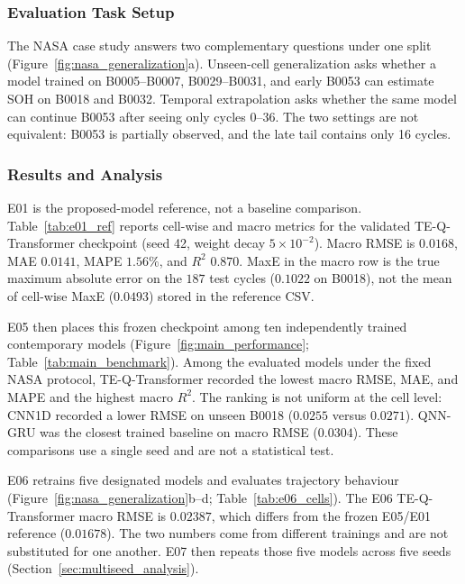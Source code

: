 \subsubsection{Evaluation Task Setup}
\label{sec:nasa_task_setup}

The NASA case study answers two complementary questions under one split (Figure~\ref{fig:nasa_generalization}a). Unseen-cell generalization asks whether a model trained on B0005--B0007, B0029--B0031, and early B0053 can estimate SOH on B0018 and B0032. Temporal extrapolation asks whether the same model can continue B0053 after seeing only cycles 0--36. The two settings are not equivalent: B0053 is partially observed, and the late tail contains only 16 cycles.

\subsubsection{Results and Analysis}
\label{sec:nasa_results}

E01 is the proposed-model reference, not a baseline comparison. Table~\ref{tab:e01_ref} reports cell-wise and macro metrics for the validated TE-Q-Transformer checkpoint (seed 42, weight decay $5\times10^{-2}$). Macro RMSE is $0.0168$, MAE $0.0141$, MAPE $1.56\%$, and $R^2$ $0.870$. MaxE in the macro row is the true maximum absolute error on the $187$ test cycles ($0.1022$ on B0018), not the mean of cell-wise MaxE ($0.0493$) stored in the reference CSV.

E05 then places this frozen checkpoint among ten independently trained contemporary models (Figure~\ref{fig:main_performance}; Table~\ref{tab:main_benchmark}). Among the evaluated models under the fixed NASA protocol, TE-Q-Transformer recorded the lowest macro RMSE, MAE, and MAPE and the highest macro $R^2$. The ranking is not uniform at the cell level: CNN1D recorded a lower RMSE on unseen B0018 ($0.0255$ versus $0.0271$). QNN-GRU was the closest trained baseline on macro RMSE ($0.0304$). These comparisons use a single seed and are not a statistical test.

E06 retrains five designated models and evaluates trajectory behaviour (Figure~\ref{fig:nasa_generalization}b--d; Table~\ref{tab:e06_cells}). The E06 TE-Q-Transformer macro RMSE is $0.02387$, which differs from the frozen E05/E01 reference ($0.01678$). The two numbers come from different trainings and are not substituted for one another. E07 then repeats those five models across five seeds (Section~\ref{sec:multiseed_analysis}).

